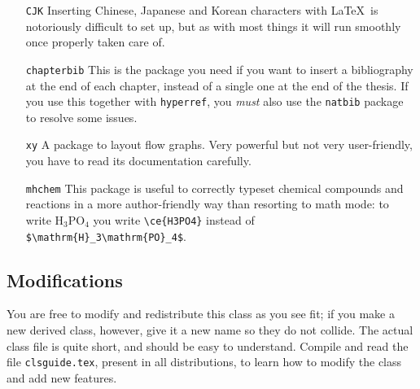 \documentclass[a4paper,10pt]{article}
\begin{document}
\begin{itemize}
\item[\texttt{CJK}] Inserting Chinese, Japanese and Korean characters with \LaTeX\ is notoriously difficult to set up, but as with most things it will run smoothly once properly taken care of.
\item[\texttt{chapterbib}] This is the package you need if you want to insert a bibliography at the end of each chapter, instead of a single one at the end of the thesis. If you use this together with \texttt{hyperref}, you \emph{must} also use the \texttt{natbib} package to resolve some issues.
\item[\texttt{xy}] A package to layout flow graphs. Very powerful but not very user-friendly, you have to read its documentation carefully.
\item[\texttt{mhchem}] This package is useful to correctly typeset chemical compounds and reactions in a more author-friendly way than resorting to math mode: to write $\mathrm{H}_3\mathrm{PO}_4$ you write \verb|\ce{H3PO4}| instead of \verb|$\mathrm{H}_3\mathrm{PO}_4$|.
\end{itemize}


\subsection*{Modifications}
You are free to modify and redistribute this class as you see fit; if you make a new derived class, however, give it a new name so they do not collide. The actual class file is quite short, and should be easy to understand. Compile and read the file \texttt{clsguide.tex}, present in all distributions, to learn how to modify the class and add new features.
\end{document}
